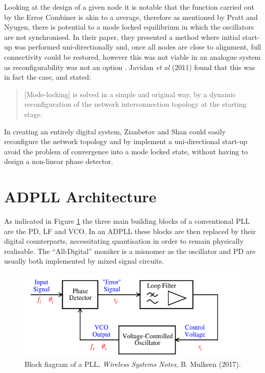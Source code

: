 Looking at the design of a given node it is notable that the function carried out by the Error Combiner is akin to a average, therefore as mentioned by Pratt and Nyugen, there is potential to a mode locked equilibrium in which the oscillators are not synchronised. In their paper, they presented a method where initial start-up was performed uni-directionally and, once all nodes are close to alignment, full connectivity could be restored, however this was not viable in an analogue system as reconfigurability was not an option \cite{pratt1995distributed}. Javidan \textit{et al} (2011) found that this was in fact the case, and stated:
\begin{quote}
	[Mode-locking] is solved in a simple and original way, by a dynamic reconfiguration of the network interconnection topology at the starting stage.
\end{quote}
In creating an entirely digital system, Zianbetov and Shan could easily reconfigure the network topology and by implement a uni-directional start-up avoid the problem of convergence into a mode locked state, without having to design a non-linear phase detector.

\section{\acl{ADPLL} Architecture}
As indicated in Figure \ref{fig:mulkeen_pll} the three main building blocks of a conventional \ac{PLL} are the \ac{PD}, \ac{LF} and \ac{VCO}. In an \ac{ADPLL} these blocks are then replaced by their digital counterparts, necessitating quantisation in order to remain physically realisable. The ``All-Digital'' moniker is a misnomer as the oscillator and \acl{PD} are usually both implemented by mixed signal circuits.
\begin{figure}[h]
	\centering
	\includegraphics[scale=0.5]{../tex_files/mulkeen_pll}
	\caption[Block fiagram of a \acl{PLL}]{Block fiagram of a \acl{PLL}, \textit{Wireless Systems Notes}, B. Mulkeen (2017).}
	\label{fig:mulkeen_pll}
\end{figure}

